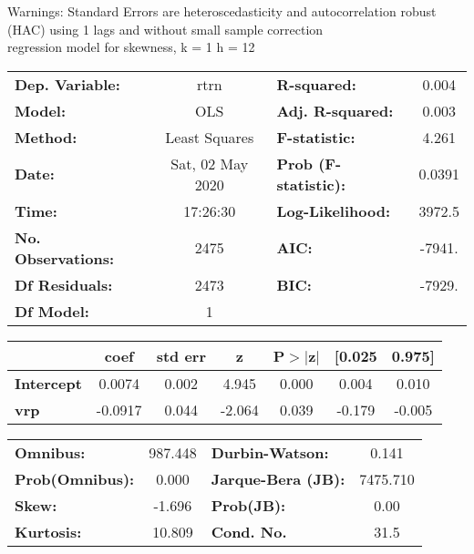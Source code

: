 Warnings: \newline
 [1] Standard Errors are heteroscedasticity and autocorrelation robust (HAC) using 1 lags and without small sample correction\\ 

regression model for skewness, k = 1 h = 12\begin{center}
\begin{tabular}{lclc}
\toprule
\textbf{Dep. Variable:}    &       rtrn       & \textbf{  R-squared:         } &     0.004   \\
\textbf{Model:}            &       OLS        & \textbf{  Adj. R-squared:    } &     0.003   \\
\textbf{Method:}           &  Least Squares   & \textbf{  F-statistic:       } &     4.261   \\
\textbf{Date:}             & Sat, 02 May 2020 & \textbf{  Prob (F-statistic):} &   0.0391    \\
\textbf{Time:}             &     17:26:30     & \textbf{  Log-Likelihood:    } &    3972.5   \\
\textbf{No. Observations:} &        2475      & \textbf{  AIC:               } &    -7941.   \\
\textbf{Df Residuals:}     &        2473      & \textbf{  BIC:               } &    -7929.   \\
\textbf{Df Model:}         &           1      & \textbf{                     } &             \\
\bottomrule
\end{tabular}
\begin{tabular}{lcccccc}
                   & \textbf{coef} & \textbf{std err} & \textbf{z} & \textbf{P$> |$z$|$} & \textbf{[0.025} & \textbf{0.975]}  \\
\midrule
\textbf{Intercept} &       0.0074  &        0.002     &     4.945  &         0.000        &        0.004    &        0.010     \\
\textbf{vrp}       &      -0.0917  &        0.044     &    -2.064  &         0.039        &       -0.179    &       -0.005     \\
\bottomrule
\end{tabular}
\begin{tabular}{lclc}
\textbf{Omnibus:}       & 987.448 & \textbf{  Durbin-Watson:     } &    0.141  \\
\textbf{Prob(Omnibus):} &   0.000 & \textbf{  Jarque-Bera (JB):  } & 7475.710  \\
\textbf{Skew:}          &  -1.696 & \textbf{  Prob(JB):          } &     0.00  \\
\textbf{Kurtosis:}      &  10.809 & \textbf{  Cond. No.          } &     31.5  \\
\bottomrule
\end{tabular}
\end{center}

